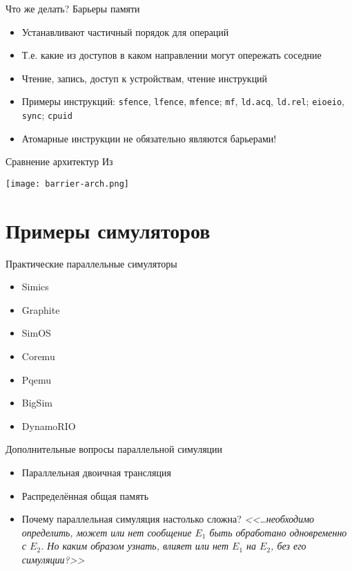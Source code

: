 \begin{frame}{Что же делать? Барьеры памяти}
\begin{itemize}
    \item Устанавливают частичный порядок для операций
    \item Т.е. какие из доступов в каком направлении могут опережать соседние
    \item Чтение, запись, доступ к устройствам, чтение инструкций
    \item Примеры инструкций: \texttt{sfence}, \texttt{lfence}, \texttt{mfence}; \texttt{mf}, \texttt{ld.acq}, \texttt{ld.rel}; \texttt{eioeio}, \texttt{sync}; \texttt{cpuid}
	\item Атомарные инструкции не обязательно являются барьерами!
\end{itemize}
\end{frame}

\begin{frame}{Сравнение архитектур}
Из~\cite{whymb}
\begin{center}
\texttt{[image: barrier-arch.png]}
\end{center}
\end{frame}

\section{Примеры симуляторов}

\begin{frame}{Практические параллельные симуляторы}
\begin{itemize}
    \item Simics
    \item Graphite
    \item SimOS
    \item Coremu
    \item Pqemu
    \item BigSim
    \item DynamoRIO
\end{itemize}
\end{frame}

\begin{frame}{Дополнительные вопросы параллельной симуляции}
\begin{itemize}
    \item Параллельная двоичная трансляция
    \item Распределённая общая память \pause
    \item Почему параллельная симуляция настолько сложна? \pause \textit{<<\dots необходимо определить, может или нет сообщение $E_1$ быть обработано одновременно с $E_2$. Но каким образом узнать, влияет или нет $E_1$ на $E_2$, без его симуляции?>>}
\end{itemize}    
\end{frame}

